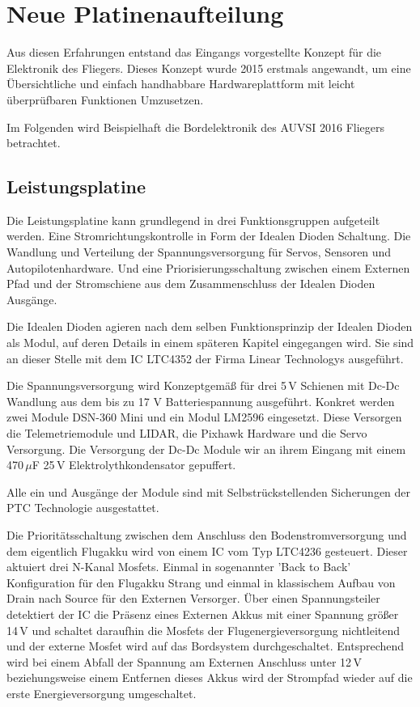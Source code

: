 \section{Neue Platinenaufteilung}

Aus diesen Erfahrungen entstand das Eingangs vorgestellte Konzept für die Elektronik des Fliegers.
Dieses Konzept wurde 2015 erstmals angewandt, um eine Übersichtliche und einfach handhabbare Hardwareplattform mit leicht überprüfbaren Funktionen Umzusetzen.

Im Folgenden wird Beispielhaft die Bordelektronik des AUVSI 2016 Fliegers betrachtet.

\subsection{Leistungsplatine}

Die Leistungsplatine kann grundlegend in drei Funktionsgruppen aufgeteilt werden.
Eine Stromrichtungskontrolle in Form der Idealen Dioden Schaltung.
Die Wandlung und Verteilung der Spannungsversorgung für Servos, Sensoren und Autopilotenhardware.
Und eine Priorisierungsschaltung zwischen einem Externen Pfad und der Stromschiene aus dem Zusammenschluss der Idealen Dioden Ausgänge.

Die Idealen Dioden agieren nach dem selben Funktionsprinzip der Idealen Dioden als Modul, auf deren Details in einem späteren Kapitel eingegangen wird. Sie sind an dieser Stelle mit dem IC LTC4352 der Firma Linear Technologys ausgeführt.

Die Spannungsversorgung wird Konzeptgemäß für drei 5\,V Schienen mit Dc-Dc Wandlung aus dem bis zu 17 V Batteriespannung ausgeführt.
Konkret werden zwei Module DSN-360 Mini und ein Modul LM2596 eingesetzt.
Diese Versorgen die Telemetriemodule und LIDAR, die Pixhawk Hardware und die Servo Versorgung.
Die Versorgung der Dc-Dc Module wir an ihrem Eingang mit einem 470\,$\mu$F 25\,V  Elektrolythkondensator gepuffert.

Alle ein und Ausgänge der Module sind mit Selbstrückstellenden Sicherungen der PTC Technologie ausgestattet.

Die Prioritätsschaltung zwischen dem Anschluss den Bodenstromversorgung und dem eigentlich Flugakku wird von einem IC vom Typ LTC4236 gesteuert. Dieser aktuiert drei N-Kanal Mosfets. Einmal in sogenannter 'Back to Back' Konfiguration für den Flugakku Strang und einmal in klassischem Aufbau von Drain nach Source für den Externen Versorger.
Über einen Spannungsteiler detektiert der IC die Präsenz eines Externen Akkus mit einer Spannung größer 14\,V und schaltet daraufhin die Mosfets der Flugenergieversorgung nichtleitend und der externe Mosfet wird auf das Bordsystem durchgeschaltet.
Entsprechend wird bei einem Abfall der Spannung am Externen Anschluss unter 12\,V beziehungsweise einem Entfernen dieses Akkus wird der Strompfad wieder auf die erste Energieversorgung umgeschaltet.


